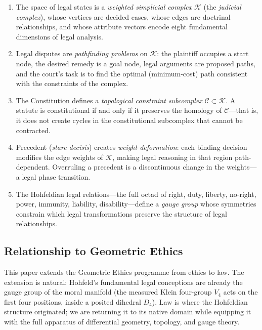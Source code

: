 \documentclass[12pt]{article}
\theoremstyle{definition}
\theoremstyle{remark}
\newcommand{\C}{\mathcal{C}}               %
\begin{document}
\begin{enumerate}[label=(\roman*)]
    \item The space of legal states is a \emph{weighted simplicial complex} $\mathcal{K}$ (the \emph{judicial complex}), whose vertices are decided cases, whose edges are doctrinal relationships, and whose attribute vectors encode eight fundamental dimensions of legal analysis.
    \item Legal disputes are \emph{pathfinding problems} on $\mathcal{K}$: the plaintiff occupies a start node, the desired remedy is a goal node, legal arguments are proposed paths, and the court's task is to find the optimal (minimum-cost) path consistent with the constraints of the complex.
    \item The Constitution defines a \emph{topological constraint subcomplex} $\C \subset \mathcal{K}$.  A statute is constitutional if and only if it preserves the homology of $\C$---that is, it does not create cycles in the constitutional subcomplex that cannot be contracted.
    \item Precedent (\emph{stare decisis}) creates \emph{weight deformation}: each binding decision modifies the edge weights of $\mathcal{K}$, making legal reasoning in that region path-dependent.  Overruling a precedent is a discontinuous change in the weights---a legal phase transition.
    \item The Hohfeldian legal relations---the full octad of right, duty, liberty, no-right, power, immunity, liability, disability---define a \emph{gauge group} whose symmetries constrain which legal transformations preserve the structure of legal relationships.
\end{enumerate}

\subsection{Relationship to Geometric Ethics}

This paper extends the Geometric Ethics programme \cite{anon2026a,anon2025a,anon2025b,anon2025c} from ethics to law.  The extension is natural: Hohfeld's fundamental legal conceptions \cite{hohfeld1913} are already the gauge group of the moral manifold (the measured Klein four-group $V_4$ acts on the first four positions, inside a posited dihedral $D_4$).  Law is where the Hohfeldian structure originated; we are returning it to its native domain while equipping it with the full apparatus of differential geometry, topology, and gauge theory.
\end{document}
